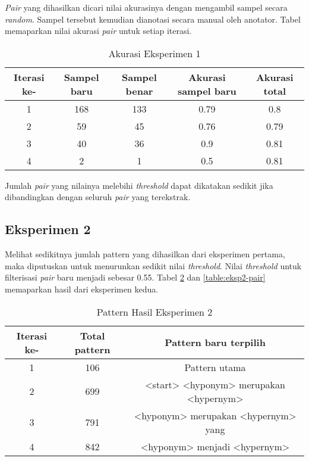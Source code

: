 \noindent \textit{Pair} yang dihasilkan dicari nilai akurasinya dengan mengambil sampel secara \textit{random}. Sampel tersebut kemudian dianotasi secara manual oleh anotator. Tabel memaparkan nilai akurasi \textit{pair} untuk setiap iterasi.

\begin{table}
  \centering
  \caption{Akurasi Eksperimen 1}
  \label{table:eksp1-akurasi}
  \begin{tabular}{|c|c|c|c|c|}
  \hline
  Iterasi ke- & Sampel baru & Sampel benar & Akurasi sampel baru & Akurasi total \\ \hline
  1           & 168         & 133          & 0.79                & 0.8 \\ \hline
  2           & 59          & 45           & 0.76                & 0.79 \\ \hline
  3           & 40          & 36           & 0.9                 & 0.81 \\ \hline
  4           & 2           & 1            & 0.5                 & 0.81 \\ \hline
  \end{tabular} 
\end{table}

\noindent Jumlah \textit{pair} yang nilainya melebihi \textit{threshold} dapat dikatakan sedikit jika dibandingkan dengan seluruh \textit{pair} yang terekstrak. 

\subsection{Eksperimen 2}
Melihat sedikitnya jumlah pattern yang dihasilkan dari eksperimen pertama, maka diputuskan untuk menurunkan sedikit nilai \textit{threshold}. Nilai \textit{threshold} untuk filterisasi \textit{pair} baru menjadi sebesar 0.55. Tabel \ref{table:eksp2-pattern} dan \ref{table:eksp2-pair} memaparkan hasil dari eksperimen kedua.

\begin{table}
  \centering
  \caption{Pattern Hasil Eksperimen 2}
  \label{table:eksp2-pattern}
  \begin{tabular}{|c|c|c|}
  \hline
    Iterasi ke- & Total pattern & Pattern baru terpilih \\ \hline
    1 & 106 & Pattern utama \\ \hline
    2 & 699 & <start> <hyponym> merupakan <hypernym> \\ \hline
    3 & 791 & <hyponym> merupakan <hypernym> yang \\ \hline
    4 & 842 & <hyponym> menjadi <hypernym> \\ \hline
  \end{tabular} 
\end{table}

